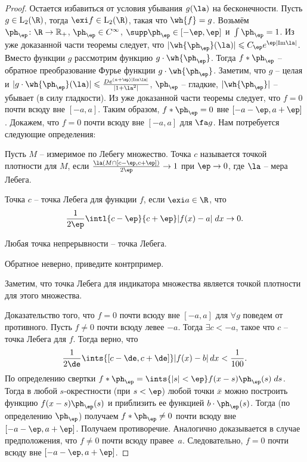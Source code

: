 \documentclass[a4paper]{article}
\newcommand{\dx}{\,dx}
\begin{document}
\begin{proof}
Остается избавиться от условия убывания $g(\la)$ на бесконечности.
Пусть $g\in\mbox{L}_2(\R)$, тогда $\exi f\in\mbox{L}_2(\R )$, такая что $\wh{f}=g$. Возьмём
$\ph_{\ep}\colon \R \rightarrow\mathbb{R_+}$, $\ph_{\ep}\in C^{\infty}$, $\supp \ph_{\ep}\in [-\ep, \ep]$
и~$\int\ph_{\ep}=1$. Из уже доказанной части теоремы следует, что $|\wh{\ph_{\ep}}(\la)|\leqslant C_{\ep}e^{\ep|\mathrm{Im}\la|}$.
Вместо функции $g$ рассмотрим функцию $g\cdot\wh{\ph_{\ep}}$. Тогда $f\ast\ph_{\ep}$ -- обратное преобразование Фурье
функции $g\cdot\wh{\ph_{\ep}}$. Заметим, что $g$ -- целая и
$|g\cdot\wh{\ph_{\ep}}(\la)|\leqslant\frac{De^{(a+\ep)|\mathrm{Im}\la|}}{|1+\la^2|}$, $\ph_{\ep}$ -- гладкие,
$|\wh{\ph_{\ep}}|$ -- убывает (в силу гладкости). Из уже доказанной части теоремы следует, что $f=0$ почти всюду вне $[-a,a]$.
Таким образом, $f\ast\ph_{\ep} = 0$ вне $[-a-\ep, a+\ep]$. Докажем, что $f=0$ почти всюду вне $[-a,a]$ для $\fa g$.
Нам потребуется следующие определения:
\begin{df}
Пусть $M$ -- измеримое по Лебегу множество. Точка $c$ называется точкой плотности для $M$, если
$\frac{\la(M\cap [c-\ep, c+\ep])}{2\ep}\rightarrow 1$ при $\ep\rightarrow 0$, где $\la$ -- мера Лебега.
\end{df}
\begin{df}
Точка $c$ -- точка Лебега для функции $f$, если $\exi a\in\R $, что
$$\frac{1}{2\ep}\intl{c-\ep}{c+\ep}|f(x)-a|\; dx \rightarrow 0.$$
\end{df}
\begin{ex}
Любая точка непрерывности -- точка Лебега.
\end{ex}
\begin{problem}
Обратное неверно, приведите контрпример.
\end{problem}
\begin{note}
Заметим, что точка Лебега для индикатора множества является точкой плотности для этого множества.
\end{note}
Доказательство того, что $f=0$ почти всюду вне $[-a,a]$ для $\forall g$ поведем от противного.
Пусть $f \ne 0$ почти всюду левее $-a$. Тогда $\exi c < -a$, такое что $c$ -- точка Лебега для $f$.
Тогда верно, что
$$\frac{1}{2\de}\ints{[c-\de,c+\de]}|f(x)-b|\dx < \frac{1}{100}.$$
По определению свертки $f\ast\ph_{\ep} = \ints{|s|<\ep}f(x-s)\ph_{\ep}(s)\; ds$.
Тогда в любой $s$-окрестности (при $s<\ep$) любой точки $\overline{x}$ можно построить функцию
$f(x-s)\ph_{\ep}(s)$ и приблизить ее функцией $b\cdot\ph_{\ep}(s)$. Тогда (по определению $\ph_{\ep}$)
получаем $f\ast\ph_{\ep}\ne 0$ почти всюду вне $[-a-\ep, a+\ep]$. Получаем противоречие.
Аналогично доказывается в случае предположения, что $f \ne 0$ почти всюду правее~$a$.
Следовательно, $f=0$ почти всюду вне $[-a-\ep, a+\ep]$.
\end{proof}
\end{document}
